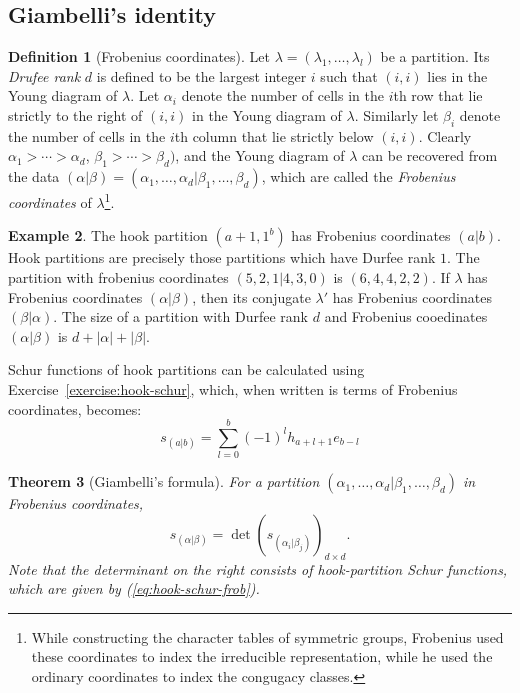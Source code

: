 \documentclass[11pt]{amsart}
\newtheorem{theorem}{Theorem}[subsection]
\theoremstyle{definition}
\newtheorem{definition}[theorem]{Definition}
\theoremstyle{example}
\newtheorem{example}[theorem]{Example}
\begin{document}
\subsection{Giambelli's identity}
\label{sec:giambelli}
\begin{definition}
  [Frobenius coordinates]
  Let $\lambda=(\lambda_1,\dotsc,\lambda_l)$ be a partition.
  Its \emph{Drufee rank} $d$ is defined to be the largest integer $i$ such that $(i,i)$ lies in the Young diagram of $\lambda$.
  Let $\alpha_i$ denote the number of cells in the $i$th row that lie strictly to the right of $(i,i)$ in the Young diagram of $\lambda$.
  Similarly let $\beta_i$ denote the number of cells in the $i$th column that lie strictly below $(i,i)$.
  Clearly $\alpha_1>\dotsb>\alpha_d$, $\beta_1>\dotsb>\beta_d)$, and the Young diagram of $\lambda$ can be recovered from the data $(\alpha|\beta)=(\alpha_1,\dotsc,\alpha_d|\beta_1,\dotsc,\beta_d)$, which are called the \emph{Frobenius coordinates} of $\lambda$\footnote{While constructing the character tables of symmetric groups, Frobenius used these coordinates to index the irreducible representation, while he used the ordinary coordinates to index the congugacy classes.}.
\end{definition}
\begin{example}
  The hook partition $(a+1,1^b)$ has Frobenius coordinates $(a|b)$.
  Hook partitions are precisely those partitions which have Durfee rank $1$.
  The partition with frobenius coordinates $(5,2,1|4,3,0)$ is $(6,4,4,2,2)$.
  If $\lambda$ has Frobenius coordinates $(\alpha|\beta)$, then its conjugate $\lambda'$ has Frobenius coordinates $(\beta|\alpha)$.
  The size of a partition with Durfee rank $d$ and Frobenius cooedinates $(\alpha|\beta)$ is $d+|\alpha|+|\beta|$. 
\end{example}
Schur functions of hook partitions can be calculated using Exercise~\ref{exercise:hook-schur}, which, when written is terms of Frobenius coordinates, becomes:
\begin{equation}
  \label{eq:hook-schur-frob}
  s_{(a|b)} = \sum_{l=0}^b (-1)^l h_{a+l+1}e_{b-l}
\end{equation}
\begin{theorem}
  [Giambelli's formula]
  For a partition $(\alpha_1,\dotsc,\alpha_d|\beta_1,\dotsc,\beta_d)$  in Frobenius coordinates,
  \begin{equation}
    \label{eq:giambelli}
    s_{(\alpha|\beta)} = \det(s_{(\alpha_i|\beta_j)})_{d\times d}.
  \end{equation}
  Note that the determinant on the right consists of hook-partition Schur functions, which are given by \textup{(\ref{eq:hook-schur-frob})}.
\end{theorem}
\end{document}
